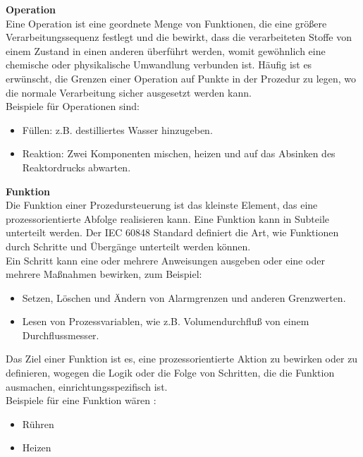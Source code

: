 \textbf{Operation}\\
Eine Operation ist eine geordnete Menge von Funktionen, die eine größere Verarbeitungssequenz festlegt und die bewirkt, dass die verarbeiteten Stoffe von einem Zustand in einen anderen überführt werden, womit gewöhnlich eine chemische oder physikalische Umwandlung verbunden ist. Häufig ist es erwünscht, die Grenzen einer Operation auf Punkte in der Prozedur zu legen, wo die normale Verarbeitung sicher ausgesetzt werden kann.\\
Beispiele für Operationen sind:
\begin{itemize}
	\item Füllen: z.B. destilliertes Wasser hinzugeben.
	\item Reaktion: Zwei Komponenten mischen, heizen und auf das Absinken des Reaktordrucks abwarten.
\end{itemize}

\textbf{Funktion}\\
Die Funktion einer Prozedursteuerung ist das kleinste Element, das eine prozessorientierte Abfolge realisieren kann. Eine Funktion kann in Subteile unterteilt werden. Der \acs{IEC} 60848 Standard definiert die Art, wie Funktionen durch Schritte und Übergänge unterteilt werden können. \\
Ein Schritt kann eine oder mehrere Anweisungen ausgeben oder eine oder mehrere Maßnahmen bewirken, zum Beispiel:
\begin{itemize}
	\item Setzen, Löschen und Ändern von Alarmgrenzen und anderen Grenzwerten.
	\item Lesen von Prozessvariablen, wie z.B. Volumendurchfluß von einem Durchflussmesser.
\end{itemize}

Das Ziel einer Funktion ist es, eine prozessorientierte Aktion zu bewirken oder zu definieren, wogegen die Logik oder die Folge von Schritten, die die Funktion ausmachen, einrichtungsspezifisch ist.\\
Beispiele für eine Funktion wären \cite{batchproc}:
\begin{itemize}
	\item Rühren
	\item Heizen
\end{itemize}

